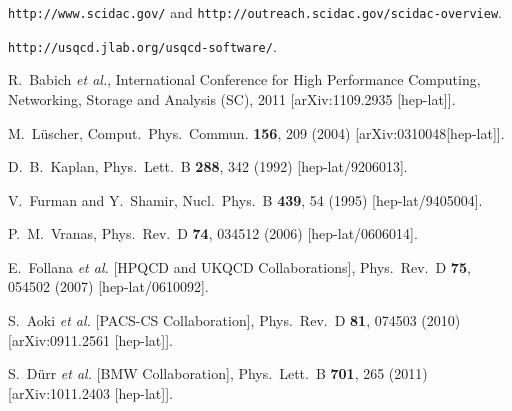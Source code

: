 \begin{thebibliography}{99}
{\tt http://www.scidac.gov/} and {\tt http://outreach.scidac.gov/scidac-overview}.
  
{\tt http://usqcd.jlab.org/usqcd-software/}.

  R.~Babich {\it et al.},
  International Conference for High Performance Computing, Networking, Storage and Analysis (SC), 2011
  [arXiv:1109.2935 [hep-lat]].

  M.\ L\"{u}scher,
  Comput.\ Phys.\ Commun. {\bf 156}, 209 (2004)
  [arXiv:0310048[hep-lat]].
  
  D.~B.~Kaplan,
  Phys.\ Lett.\ B {\bf 288}, 342 (1992)
  [hep-lat/9206013].
  
  V.~Furman and Y.~Shamir,
  Nucl.\ Phys.\ B {\bf 439}, 54 (1995)
  [hep-lat/9405004].
  
  P.~M.~Vranas,
  Phys.\ Rev.\ D {\bf 74}, 034512 (2006)
  [hep-lat/0606014].
  
  E.~Follana {\it et al.}  [HPQCD and UKQCD Collaborations],
  Phys.\ Rev.\ D {\bf 75}, 054502 (2007)
  [hep-lat/0610092].
  
  S.~Aoki {\it et al.}  [PACS-CS Collaboration],
  Phys.\ Rev.\ D {\bf 81}, 074503 (2010)
  [arXiv:0911.2561 [hep-lat]].
  
  S.~D{\"u}rr {\it et al.} [BMW Collaboration],
  Phys.\ Lett.\ B {\bf 701}, 265 (2011)
  [arXiv:1011.2403 [hep-lat]].
  

\end{thebibliography}
